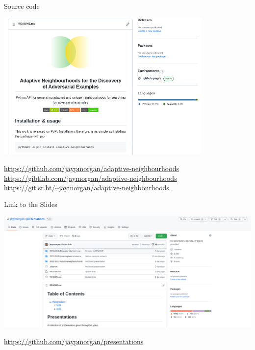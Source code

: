 \documentclass[smaller]{beamer}
\begin{document}
\begin{frame}[label={sec:org71e4ae1}]{Source code}
\begin{center}
\includegraphics[width=0.8\textwidth]{images/github-repo.png}
\end{center}

\begin{center}
\url{https://github.com/jaypmorgan/adaptive-neighbourhoods}
\url{https://gibtlab.com/jaymorgan/adaptive-neighbourhoods}
\url{https://git.sr.ht/~jaymorgan/adaptive-neighbourhoods}
\end{center}
\end{frame}

\begin{frame}[label={sec:orged3b712}]{Link to the Slides}
\begin{center}
\includegraphics[width=1.0\textwidth]{images/presentations.png}
\end{center}

\begin{center}
\url{https://github.com/jaypmorgan/presentations}
\end{center}
\end{frame}
\end{document}
